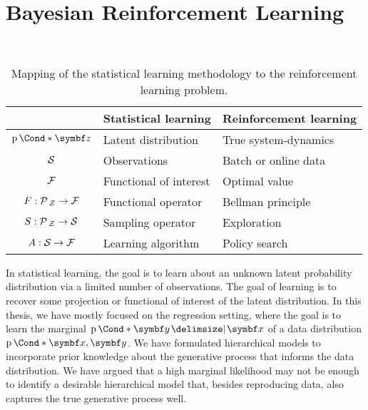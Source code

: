 \section{Bayesian Reinforcement Learning}
\label{toc:discussion:mountaincar}
\begin{table}[t]
    \caption[Statistical learning methodology in reinforcement learning]{
        \label{tab:mountaincar:quantities_of_interest}
        Mapping of the statistical learning methodology to the reinforcement learning problem.
    }
    \centering
    \\[\figureskip]
    \begin{tabularx}{.9\textwidth}{cYY}
        \toprule
                                  & Statistical learning   & Reinforcement learning \\
        \midrule
        $\Prob*{\mat{z}}$         & Latent distribution    & True system-dynamics   \\
        $\mathcal{S}$                     & Observations           & Batch or online data   \\
        $\mathcal{F}$                     & Functional of interest & Optimal value          \\
        \midrule
        $F : \operatorname{\mathcal{P}\mkern2mu}_{\mathcal{Z}} \to \mathcal{F}$ & Functional operator    & Bellman principle      \\
        $S : \operatorname{\mathcal{P}\mkern2mu}_{\mathcal{Z}} \to \mathcal{S}$ & Sampling operator      & Exploration            \\
        $A : \mathcal{S} \to \mathcal{F}$         & Learning algorithm     & Policy search          \\
        \bottomrule
    \end{tabularx}
\end{table}
In statistical learning, the goal is to learn about an unknown latent probability distribution via a limited number of observations.
The goal of learning is to recover some projection or functional of interest of the latent distribution.
In this thesis, we have mostly focused on the regression setting, where the goal is to learn the marginal $\Prob*{\mat{y} \given \mat{x}}$ of a data distribution $\Prob*{\mat{x}, \mat{y}}$.
We have formulated hierarchical models to incorporate prior knowledge about the generative process that informs the data distribution.
We have argued that a high marginal likelihood may not be enough to identify a desirable hierarchical model that, besides reproducing data, also captures the true generative process well.

